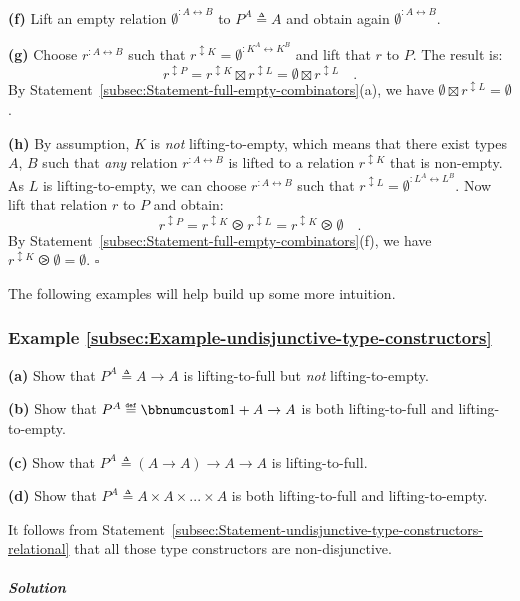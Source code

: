\textbf{(f)} Lift an empty relation $\emptyset^{:A\leftrightarrow B}$
to $P^{A}\triangleq A$ and obtain again $\emptyset^{:A\leftrightarrow B}$.

\textbf{(g)} Choose $r^{:A\leftrightarrow B}$ such that $r^{\updownarrow K}=\emptyset^{:K^{A}\leftrightarrow K^{B}}$
and lift that $r$ to $P$. The result is:
\[
r^{\updownarrow P}=r^{\updownarrow K}\boxtimes r^{\updownarrow L}=\emptyset\boxtimes r^{\updownarrow L}\quad.
\]
By Statement~\ref{subsec:Statement-full-empty-combinators}(a), we
have $\emptyset\boxtimes r^{\updownarrow L}=\emptyset$.

\textbf{(h)} By assumption, $K$ is \emph{not} lifting-to-empty, which
means that there exist types $A$, $B$ such that \emph{any} relation
$r^{:A\leftrightarrow B}$ is lifted to a relation $r^{\updownarrow K}$
that is non-empty. As $L$ is lifting-to-empty, we can choose $r^{:A\leftrightarrow B}$
such that $r^{\updownarrow L}=\emptyset^{:L^{A}\leftrightarrow L^{B}}$.
Now lift that relation $r$ to $P$ and obtain:
\[
r^{\updownarrow P}=r^{\updownarrow K}\ogreaterthan r^{\updownarrow L}=r^{\updownarrow K}\ogreaterthan\emptyset\quad.
\]
By Statement~\ref{subsec:Statement-full-empty-combinators}(f), we
have $r^{\updownarrow K}\ogreaterthan\emptyset=\emptyset$. $\square$

The following examples will help build up some more intuition.

\subsubsection{Example \label{subsec:Example-undisjunctive-type-constructors}\ref{subsec:Example-undisjunctive-type-constructors}}

\textbf{(a)} Show that $P^{A}\triangleq A\rightarrow A$ is lifting-to-full
but \emph{not} lifting-to-empty.

\textbf{(b)} Show that $P^{A}\triangleq\bbnum 1+A\rightarrow A$ is
both lifting-to-full and lifting-to-empty.

\textbf{(c)} Show that $P^{A}\triangleq\left(A\rightarrow A\right)\rightarrow A\rightarrow A$
is lifting-to-full.

\textbf{(d)} Show that $P^{A}\triangleq A\times A\times...\times A$
is both lifting-to-full and lifting-to-empty.

It follows from Statement~\ref{subsec:Statement-undisjunctive-type-constructors-relational}
that all those type constructors are non-disjunctive.

\subparagraph{Solution}

